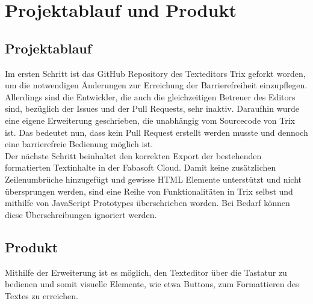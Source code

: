 \section{Projektablauf und Produkt}
\subsection{Projektablauf}
Im ersten Schritt ist das GitHub Repository des Texteditors Trix geforkt worden, um die notwendigen Änderungen zur Erreichung der Barrierefreiheit einzupflegen. Allerdings sind die Entwickler, die auch die gleichzeitigen Betreuer des Editors sind, bezüglich der Issues und der Pull Requests, sehr inaktiv. Daraufhin wurde eine eigene Erweiterung geschrieben, die unabhängig vom Sourcecode von Trix ist. Das bedeutet nun, dass kein Pull Request erstellt werden musste und dennoch eine barrierefreie Bedienung möglich ist.\\
Der nächste Schritt beinhaltet den korrekten Export der bestehenden formatierten Textinhalte in der Fabasoft Cloud. Damit keine zusätzlichen Zeilenumbrüche hinzugefügt und gewisse HTML Elemente unterstützt und nicht übersprungen werden, sind eine Reihe von Funktionalitäten in Trix selbst und mithilfe von JavaScript Prototypes überschrieben worden. Bei Bedarf können diese Überschreibungen ignoriert werden.

\subsection{Produkt}
Mithilfe der Erweiterung ist es möglich, den Texteditor über die Tastatur zu bedienen und somit visuelle Elemente, wie etwa Buttons, zum Formattieren des Textes zu erreichen. 